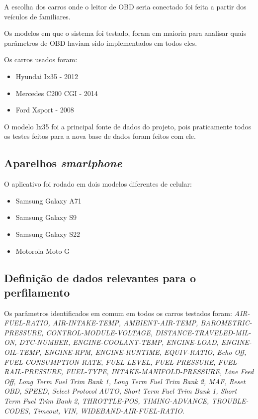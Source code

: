     A escolha dos carros onde o leitor de OBD seria conectado foi feita a partir dos veículos de familiares.

    Os modelos em que o sistema foi testado, foram em maioria para analisar quais parâmetros de OBD haviam sido implementados em todos eles.

    Os carros usados foram:

    \begin{itemize}
        \item Hyundai Ix35 - 2012
        \item Mercedes C200 CGI - 2014
        \item Ford Xsport - 2008
    \end{itemize}

    
    O modelo Ix35 foi a principal fonte de dados do projeto, pois praticamente todos os testes feitos para a nova base de dados foram feitos com ele.

    \subsection{Aparelhos \textit{smartphone}}

    O aplicativo foi rodado em dois modelos diferentes de celular:
    \begin{itemize}
        \item Samsung Galaxy A71
        \item Samsung Galaxy S9
        \item Samsung Galaxy S22
        \item Motorola Moto G
    \end{itemize}

\subsection{Definição de dados relevantes para o perfilamento}

    Os parâmetros identificados em comum em todos os carros testados foram: \textit{AIR-FUEL-RATIO, AIR-INTAKE-TEMP, AMBIENT-AIR-TEMP, BAROMETRIC-PRESSURE, CONTROL-MODULE-VOLTAGE, DISTANCE-TRAVELED-MIL-ON, DTC-NUMBER, ENGINE-COOLANT-TEMP, ENGINE-LOAD, ENGINE-OIL-TEMP, ENGINE-RPM, ENGINE-RUNTIME, EQUIV-RATIO, Echo Off, FUEL-CONSUMPTION-RATE, FUEL-LEVEL, FUEL-PRESSURE, FUEL-RAIL-PRESSURE, FUEL-TYPE, INTAKE-MANIFOLD-PRESSURE, Line Feed Off, Long Term Fuel Trim Bank 1, Long Term Fuel Trim Bank 2, MAF, Reset OBD, SPEED, Select Protocol AUTO, Short Term Fuel Trim Bank 1, Short Term Fuel Trim Bank 2, THROTTLE-POS, TIMING-ADVANCE, TROUBLE-CODES, Timeout, VIN, WIDEBAND-AIR-FUEL-RATIO}.

